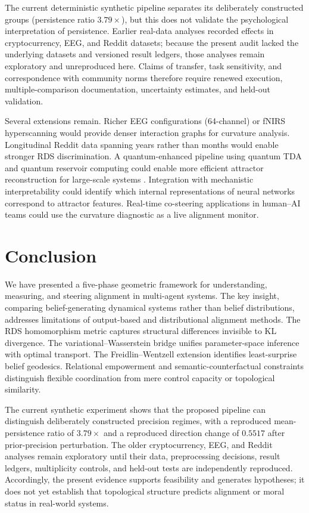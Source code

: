 \documentclass[11pt,a4paper]{article}
\theoremstyle{definition}
\begin{document}
The current deterministic synthetic pipeline separates its deliberately constructed groups (persistence ratio $3.79\times$), but this does not validate the psychological interpretation of persistence. Earlier real-data analyses recorded effects in cryptocurrency, EEG, and Reddit datasets; because the present audit lacked the underlying datasets and versioned result ledgers, those analyses remain exploratory and unreproduced here. Claims of transfer, task sensitivity, and correspondence with community norms therefore require renewed execution, multiple-comparison documentation, uncertainty estimates, and held-out validation.

Several extensions remain. Richer EEG configurations (64-channel) or fNIRS hyperscanning \citep{nguyen2022parentchild, berretz2025socialtouch} would provide denser interaction graphs for curvature analysis. Longitudinal Reddit data spanning years rather than months would enable stronger RDS discrimination. A quantum-enhanced pipeline using quantum TDA and quantum reservoir computing could enable more efficient attractor reconstruction for large-scale systems \citep{lloyd2016quantum}. Integration with mechanistic interpretability could identify which internal representations of neural networks correspond to attractor features. Real-time co-steering applications in human--AI teams could use the curvature diagnostic as a live alignment monitor.


\section{Conclusion}
\label{sec:conclusion}

We have presented a five-phase geometric framework for understanding, measuring, and steering alignment in multi-agent systems. The key insight, comparing belief-generating dynamical systems rather than belief distributions, addresses limitations of output-based and distributional alignment methods. The RDS homomorphism metric captures structural differences invisible to KL divergence. The variational--Wasserstein bridge unifies parameter-space inference with optimal transport. The Freidlin--Wentzell extension identifies least-surprise belief geodesics. Relational empowerment and semantic-counterfactual constraints distinguish flexible coordination from mere control capacity or topological similarity.

The current synthetic experiment shows that the proposed pipeline can distinguish deliberately constructed precision regimes, with a reproduced mean-persistence ratio of $3.79\times$ and a reproduced direction change of $0.5517$ after prior-precision perturbation. The older cryptocurrency, EEG, and Reddit analyses remain exploratory until their data, preprocessing decisions, result ledgers, multiplicity controls, and held-out tests are independently reproduced. Accordingly, the present evidence supports feasibility and generates hypotheses; it does not yet establish that topological structure predicts alignment or moral status in real-world systems.
\end{document}
